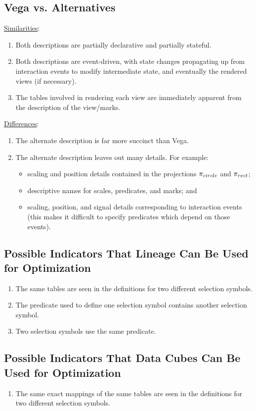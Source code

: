 \subsection{Vega vs. Alternatives}
\underline{Similarities}:
\begin{enumerate}
	\item Both descriptions are partially declarative and partially stateful.
	\item Both descriptions are event-driven, with state changes propagating up from interaction events to modify intermediate state, and eventually the rendered views (if necessary).
	\item The tables involved in rendering each view are immediately apparent from the description of the view/marks.
\end{enumerate}
\underline{Differences}:
\begin{enumerate}
	\item The alternate description is far more succinct than Vega.
	\item The alternate description leaves out many details.
		For example:
		\begin{itemize}
			\item scaling and position details contained in the projections $\mathlarger{\pi}_{circle}$ and $\mathlarger{\pi}_{rect}$;
			\item descriptive names for scales, predicates, and marks; and
			\item scaling, position, and signal details corresponding to interaction events (this makes it difficult to specify predicates which depend on those events).
		\end{itemize}
\end{enumerate}
\subsection{Possible Indicators That Lineage Can Be Used for Optimization}
\begin{enumerate}
	\item The same tables are seen in the definitions for two different selection symbols.
	\item The predicate used to define one selection symbol contains another selection symbol.
	\item Two selection symbols use the same predicate.
\end{enumerate}
\subsection{Possible Indicators That Data Cubes Can Be Used for Optimization}
\begin{enumerate}
	\item The same exact mappings of the same tables are seen in the definitions for two different selection symbols.
\end{enumerate}